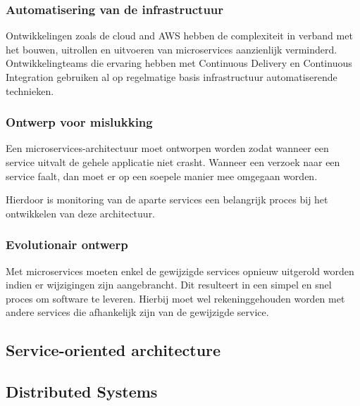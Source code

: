 \subsubsection{Automatisering van de infrastructuur}

Ontwikkelingen zoals de cloud and AWS hebben de complexiteit in verband met het bouwen, uitrollen en uitvoeren van microservices aanzienlijk verminderd. Ontwikkelingteams die ervaring hebben met Continuous Delivery en Continuous Integration gebruiken al op regelmatige basis infrastructuur automatiserende technieken.

\subsubsection{Ontwerp voor mislukking}

Een microservices-architectuur moet ontworpen worden zodat wanneer een service uitvalt de gehele applicatie niet crasht. Wanneer een verzoek naar een service faalt, dan moet er op een soepele manier mee omgegaan worden.

Hierdoor is monitoring van de aparte services een belangrijk proces bij het ontwikkelen van deze architectuur.

\subsubsection{Evolutionair ontwerp}

Met microservices moeten enkel de gewijzigde services opnieuw uitgerold worden indien er wijzigingen zijn aangebrancht. Dit resulteert in een simpel en snel proces om software te leveren. Hierbij moet wel rekeninggehouden worden met andere services die afhankelijk zijn van de gewijzigde service.

\subsection{Service-oriented architecture}
\label{sec:soa}

\subsection{Distributed Systems}


